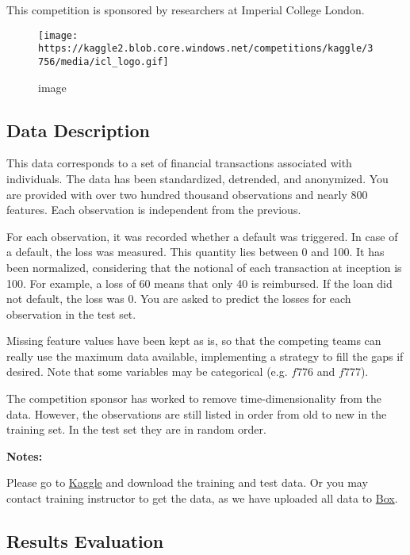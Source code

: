 \documentclass[11pt]{article}
\makeatletter
\def\maxwidth{\ifdim\Gin@nat@width>\linewidth\linewidth
    \else\Gin@nat@width\fi}
\let\Oldincludegraphics\includegraphics
\renewcommand{\includegraphics}[1]{\Oldincludegraphics[width=.8\maxwidth]{#1}}
\makeatother
\begin{document}
This competition is sponsored by researchers at Imperial College London.

\begin{figure}
\centering
\texttt{[image: https://kaggle2.blob.core.windows.net/competitions/kaggle/3756/media/icl\_logo.gif]}
\caption{image}
\end{figure}

\hypertarget{data-description}{%
\subsection{Data Description}\label{data-description}}

This data corresponds to a set of financial transactions associated with
individuals. The data has been standardized, detrended, and anonymized.
You are provided with over two hundred thousand observations and nearly
800 features. Each observation is independent from the previous.

For each observation, it was recorded whether a default was triggered.
In case of a default, the loss was measured. This quantity lies between
0 and 100. It has been normalized, considering that the notional of each
transaction at inception is 100. For example, a loss of 60 means that
only 40 is reimbursed. If the loan did not default, the loss was 0. You
are asked to predict the losses for each observation in the test set.

Missing feature values have been kept as is, so that the competing teams
can really use the maximum data available, implementing a strategy to
fill the gaps if desired. Note that some variables may be categorical
(e.g. \(f776\) and \(f777\)).

The competition sponsor has worked to remove time-dimensionality from
the data. However, the observations are still listed in order from old
to new in the training set. In the test set they are in random order.

\textbf{Notes:}

Please go to
\href{https://www.kaggle.com/c/loan-default-prediction/data}{Kaggle} and
download the training and test data. Or you may contact training
instructor to get the data, as we have uploaded all data to
\href{https://ibm.box.com/s/obp4r1k35tsqggmea04kvo02xpay6tjq}{Box}.

\hypertarget{results-evaluation}{%
\subsection{Results Evaluation}\label{results-evaluation}}
\end{document}
